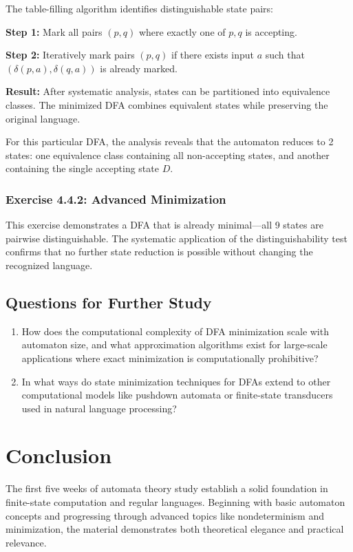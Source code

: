 \documentclass{article}
\begin{document}
The table-filling algorithm identifies distinguishable state pairs:

\textbf{Step 1:} Mark all pairs $(p,q)$ where exactly one of $p,q$ is accepting.

\textbf{Step 2:} Iteratively mark pairs $(p,q)$ if there exists input $a$ such that $(\delta(p,a), \delta(q,a))$ is already marked.

\textbf{Result:} After systematic analysis, states can be partitioned into equivalence classes. The minimized DFA combines equivalent states while preserving the original language.

For this particular DFA, the analysis reveals that the automaton reduces to 2 states: one equivalence class containing all non-accepting states, and another containing the single accepting state $D$.

\subsubsection{Exercise 4.4.2: Advanced Minimization}

This exercise demonstrates a DFA that is already minimal—all 9 states are pairwise distinguishable. The systematic application of the distinguishability test confirms that no further state reduction is possible without changing the recognized language.

\subsection{Questions for Further Study}
\begin{enumerate}
    \item How does the computational complexity of DFA minimization scale with automaton size, and what approximation algorithms exist for large-scale applications where exact minimization is computationally prohibitive?
    
    \item In what ways do state minimization techniques for DFAs extend to other computational models like pushdown automata or finite-state transducers used in natural language processing?
\end{enumerate}

\section{Conclusion}

The first five weeks of automata theory study establish a solid foundation in finite-state computation and regular languages. Beginning with basic automaton concepts and progressing through advanced topics like nondeterminism and minimization, the material demonstrates both theoretical elegance and practical relevance.
\end{document}
